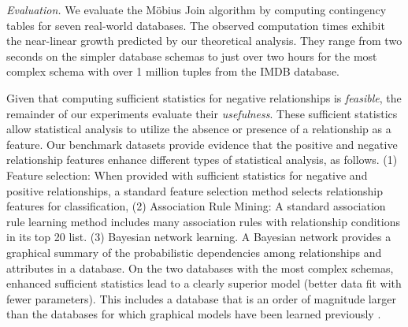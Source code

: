 \documentclass{sig-alternate-2013}
\begin{document}
\emph{Evaluation.} We evaluate the M\"obius Join algorithm by computing contingency tables for seven real-world databases. The observed computation times exhibit the near-linear growth predicted by our theoretical analysis. 
They range from two seconds on the simpler database schemas to just over two hours for the most complex schema with over 1 million tuples from the IMDB database.

Given that computing sufficient statistics for negative relationships is {\em feasible}, the remainder of our experiments evaluate their {\em usefulness}. These sufficient statistics allow statistical analysis to utilize the absence or presence of a relationship as a feature. 
Our benchmark datasets provide evidence that the positive and negative relationship features enhance different types of statistical analysis, as follows. (1) Feature selection: When provided with sufficient statistics for negative and positive relationships,
a standard feature selection method selects relationship features for classification,
(2) Association Rule Mining: A standard association rule learning method includes many association rules with relationship conditions in its top 20 list. 
(3) Bayesian network learning. A Bayesian network provides a graphical summary of the probabilistic dependencies among relationships and attributes in a database. On the two databases with the most complex schemas, enhanced sufficient statistics lead to a clearly superior model (better data fit with fewer parameters). This includes a database that is an order of magnitude larger than the databases for which graphical models  have been learned previously \cite{Schulte2012}. 
%
\end{document}

